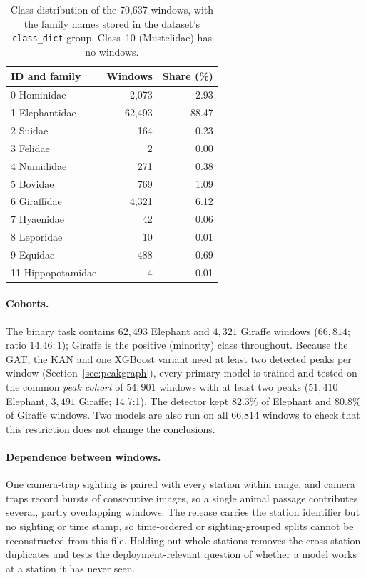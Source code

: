 \documentclass[a4paper,fleqn]{cas-dc}
\begin{document}
\begin{table}[width=\linewidth,cols=3,pos=t]
\caption{Class distribution of the 70,637 windows, with the family names stored in the
dataset's \texttt{class\_dict} group. Class~10 (Mustelidae) has no windows.}
\label{tbl:classes}
\begin{tabular*}{\tblwidth}{@{}lrr@{}}
\toprule
ID and family & Windows & Share (\%) \\
\midrule
0 Hominidae & 2,073 & 2.93 \\
1 Elephantidae & 62,493 & 88.47 \\
2 Suidae & 164 & 0.23 \\
3 Felidae & 2 & 0.00 \\
4 Numididae & 271 & 0.38 \\
5 Bovidae & 769 & 1.09 \\
6 Giraffidae & 4,321 & 6.12 \\
7 Hyaenidae & 42 & 0.06 \\
8 Leporidae & 10 & 0.01 \\
9 Equidae & 488 & 0.69 \\
11 Hippopotamidae & 4 & 0.01 \\
\bottomrule
\end{tabular*}
\end{table}

\paragraph{Cohorts.} The binary task contains $62{,}493$ Elephant and $4{,}321$ Giraffe
windows ($66{,}814$; ratio $14.46\!:\!1$); Giraffe is the positive (minority) class
throughout. Because the GAT, the KAN and one XGBoost variant need at least two detected
peaks per window (Section~\ref{sec:peakgraph}), every primary model is trained and tested
on the common \emph{peak cohort} of $54{,}901$ windows with at least two peaks
($51{,}410$ Elephant, $3{,}491$ Giraffe; 14.7:1). The detector kept 82.3\% of Elephant and
80.8\% of Giraffe windows. Two models are also run on all 66,814 windows to check that
this restriction does not change the conclusions.

\paragraph{Dependence between windows.} One camera-trap sighting is paired with every
station within range, and camera traps record bursts of consecutive images, so a single
animal passage contributes several, partly overlapping windows. The release carries the
station identifier but no sighting or time stamp, so time-ordered or sighting-grouped
splits cannot be reconstructed from this file. Holding out whole stations removes the
cross-station duplicates and tests the deployment-relevant question of whether a model
works at a station it has never seen.
\end{document}
